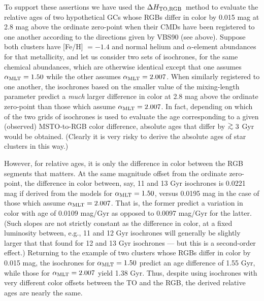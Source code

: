 \documentclass[12pt,preprint]{aastex}
\newcommand\amlt{{\alpha_{\rm MLT}}}
\newcommand\delc{\Delta H_{\rm TO,RGB}}
\newcommand\gta{\mathrel{\hbox{\raise 0.6 ex \hbox{$>$}\kern
                   -1.7 ex\lower .5 ex\hbox{$\sim$}}}}
\begin{document}
To support these assertions we have used the $\delc$\ method to evaluate
the relative ages of two hypothetical GCs whose RGBs differ in color by 0.015
mag at 2.8 mag above the ordinate zero-point when their CMDs have been 
registered to one another according to the directions given by VBS90 (see 
above).  Suppose both clusters have [Fe/H] $= -1.4$ and normal helium and
$\alpha$-element abundances for that metallicity, and let us consider two sets
of isochrones, for the same chemical abundances, which are otherwise identical
except that one assumes $\amlt = 1.50$ while the other assumes $\amlt = 2.007$.
When similarly registered to one another, the isochrones based on the smaller
value of the mixing-length parameter predict a {\it much} larger difference in
color at 2.8 mag above the ordinate zero-point than those which assume $\amlt
= 2.007$.  In fact, depending on which of the two grids of isochrones is used
to evaluate the age corresponding to a given (observed) MSTO-to-RGB color
difference, absolute ages that differ by $\gta 3$ Gyr would be obtained.  
(Clearly it is very risky to derive the absolute ages of star clusters in this
way.)

However, for relative ages, it is only the difference in color between the RGB
segments that matters.  At the same magnitude offset from the ordinate
zero-point, the difference in color between, say, 11 and 13 Gyr isochrones is
0.0221 mag if derived from the models for $\amlt = 1.50$, versus 0.0195 mag in
the case of those which assume $\amlt = 2.007$.  That is, the former predict a
variation in color with age of 0.0109 mag/Gyr as opposed to 0.0097 mag/Gyr for
the latter.  (Such slopes are not strictly constant as the difference in color,
at a fixed luminosity between, e.g., 11 and 12 Gyr isochrones will generally be
slightly larger that that found for 12 and 13 Gyr isochrones --- but this is a
second-order effect.)  Returning to the example of two clusters whose RGBs
differ in color by 0.015 mag, the isochrones for $\amlt = 1.50$ predict an age
difference of 1.55 Gyr, while those for $\amlt = 2.007$ yield 1.38 Gyr.  Thus,
despite using isochrones with very different color offsets between the TO and
the RGB, the derived relative ages are nearly the same.
\end{document}
